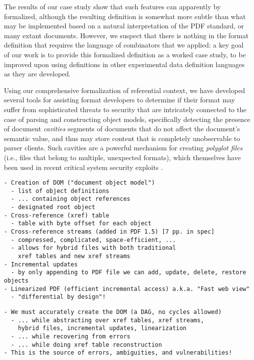 The results of our case study show that such features can apparently
by formalized, although the resulting definition is somewhat more
subtle than what may be implemented based on a natural interpretation
of the PDF standard, or many extant documents.  
%
However, we suspect that there is nothing in the format definition
that requires the language of combinators that we applied: a key goal
of our work is to provide this formalized definition as a worked case
study, to be improved upon using definitions in other experimental
data definition languages as they are developed.

Using our comprehensive formalization of referential context, we have
developed several tools for assisting format developers to determine
if their format may suffer from sophisticated threats to security that
are intricately connected to the case of parsing and constructing object models,
specifically detecting the presence of document \emph{cavities}
segments of documents that do not affect the document's semantic
value, and thus may store content that is completely unobservable to
parser clients.
%
Such cavities are a powerful mechanism for creating \emph{polyglot
  files} (i.e., files that belong to multiple, unexpected formats),
which themselves have been used in recent critical system security
exploits .

\begin{lstlisting}[style=meta]
- Creation of DOM ("document object model")
  - list of object definitions
  - ... containing object references
  - designated root object
- Cross-reference (xref) table
  - table with byte offset for each object
- Cross-reference streams (added in PDF 1.5) [7 pp. in spec]
  - compressed, complicated, space-efficient, ...
  - allows for hybrid files with both traditional
    xref tables and new xref streams
- Incremental updates
  - by only appending to PDF file we can add, update, delete, restore objects
- Linearized PDF (efficient incremental access) a.k.a. "Fast web view"
  - "differential by design"!
\end{lstlisting}
\begin{lstlisting}[style=meta]
- We must accurately create the DOM (a DAG, no cycles allowed)
  - ... while abstracting over xref tables, xref streams,
    hybrid files, incremental updates, linearization
  - ... while recovering from errors
  - ... while doing xref table reconstruction
- This is the source of errors, ambiguities, and vulnerabilities!
\end{lstlisting}

